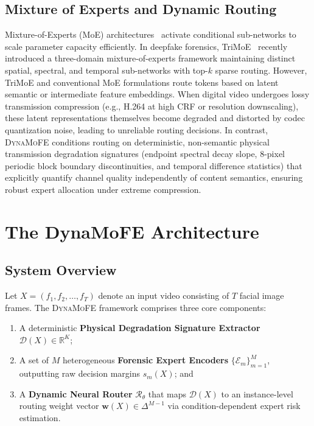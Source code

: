 \documentclass[conference]{IEEEtran}
\newcommand{\dynamofe}{\textsc{DynaMoFE}}
\begin{document}
\subsection{Mixture of Experts and Dynamic Routing}
Mixture-of-Experts (MoE) architectures~\cite{shazeer2017moe} activate conditional sub-networks to scale parameter capacity efficiently. In deepfake forensics, TriMoE~\cite{dutta2026trimoe} recently introduced a three-domain mixture-of-experts framework maintaining distinct spatial, spectral, and temporal sub-networks with top-$k$ sparse routing. However, TriMoE and conventional MoE formulations route tokens based on latent semantic or intermediate feature embeddings. When digital video undergoes lossy transmission compression (e.g., H.264 at high CRF or resolution downscaling), these latent representations themselves become degraded and distorted by codec quantization noise, leading to unreliable routing decisions. In contrast, \dynamofe{} conditions routing on deterministic, non-semantic physical transmission degradation signatures (endpoint spectral decay slope, 8-pixel periodic block boundary discontinuities, and temporal difference statistics) that explicitly quantify channel quality independently of content semantics, ensuring robust expert allocation under extreme compression.

\section{The DynaMoFE Architecture}

\subsection{System Overview}
Let $X = (f_1, f_2, \ldots, f_T)$ denote an input video consisting of $T$ facial image frames. The \dynamofe{} framework comprises three core components:
\begin{enumerate}
    \item A deterministic \textbf{Physical Degradation Signature Extractor} $\mathcal{D}(X) \in \mathbb{R}^K$;
    \item A set of $M$ heterogeneous \textbf{Forensic Expert Encoders} $\{\mathcal{E}_m\}_{m=1}^M$, outputting raw decision margins $s_m(X)$; and
    \item A \textbf{Dynamic Neural Router} $\mathcal{R}_\theta$ that maps $\mathcal{D}(X)$ to an instance-level routing weight vector $\mathbf{w}(X) \in \Delta^{M-1}$ via condition-dependent expert risk estimation.
\end{enumerate}
\end{document}

